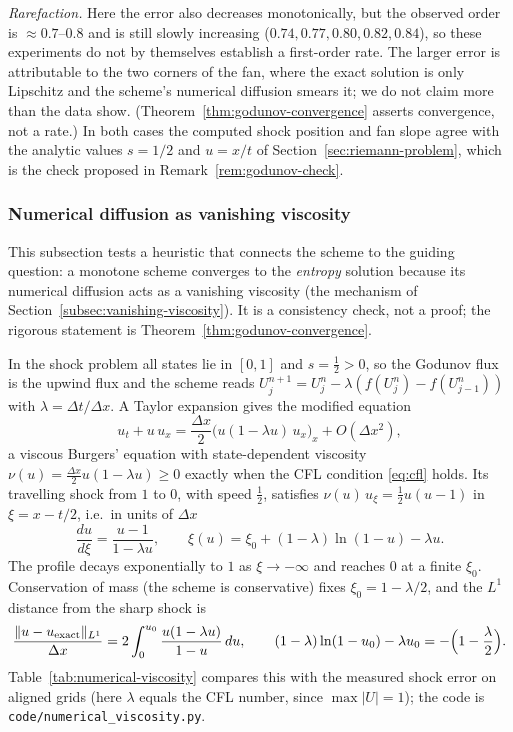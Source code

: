 \emph{Rarefaction.} Here the error also decreases monotonically, but the
observed order is $\approx0.7$--$0.8$ and is still slowly increasing
($0.74,0.77,0.80,0.82,0.84$), so these experiments do not by themselves
establish a first-order rate. The larger error is attributable to the two
corners of the fan, where the exact solution is only Lipschitz and the
scheme's numerical diffusion smears it; we do not claim more than the data
show. (Theorem~\ref{thm:godunov-convergence} asserts convergence, not a
rate.) In both cases the computed shock position and fan slope agree with
the analytic values $s=1/2$ and $u=x/t$ of
Section~\ref{sec:riemann-problem}, which is the check proposed in
Remark~\ref{rem:godunov-check}.

\subsubsection{Numerical diffusion as vanishing viscosity}
\label{subsubsec:numerical-viscosity}

This subsection tests a heuristic that connects the scheme to the guiding
question: a monotone scheme converges to the \emph{entropy} solution because
its numerical diffusion acts as a vanishing viscosity (the mechanism of
Section~\ref{subsec:vanishing-viscosity}). It is a consistency check, not a
proof; the rigorous statement is Theorem~\ref{thm:godunov-convergence}.

In the shock problem all states lie in $[0,1]$ and $s=\tfrac12>0$, so the
Godunov flux is the upwind flux and the scheme reads $U_j^{n+1}=U_j^n-
\lambda(f(U_j^n)-f(U_{j-1}^n))$ with $\lambda=\Delta t/\Delta x$. A Taylor
expansion gives the modified equation
\begin{equation}
  \label{eq:modified-equation}
  u_t+u\,u_x=\frac{\Delta x}{2}\big(u(1-\lambda u)\,u_x\big)_x+O(\Delta x^2),
\end{equation}
a viscous Burgers' equation with state-dependent viscosity
$\nu(u)=\tfrac{\Delta x}2u(1-\lambda u)\ge0$ exactly when the CFL condition
\eqref{eq:cfl} holds. Its travelling shock from $1$ to $0$, with speed
$\tfrac12$, satisfies $\nu(u)\,u_\xi=\tfrac12u(u-1)$ in $\xi=x-t/2$, i.e.\ in
units of $\Delta x$
\begin{equation}
  \frac{du}{d\xi}=\frac{u-1}{1-\lambda u},\qquad
  \xi(u)=\xi_0+(1-\lambda)\ln(1-u)-\lambda u .
\end{equation}
The profile decays exponentially to $1$ as $\xi\to-\infty$ and reaches $0$ at
a finite $\xi_0$. Conservation of mass (the scheme is conservative) fixes
$\xi_0=1-\lambda/2$, and the $L^1$ distance from the sharp shock is
\begin{equation}
  \frac{\|u-u_{\rm exact}\|_{L^1}}{\Delta x}
  =2\int_0^{u_0}\frac{u(1-\lambda u)}{1-u}\,du,\qquad
  (1-\lambda)\ln(1-u_0)-\lambda u_0=-\Big(1-\frac\lambda2\Big).
\end{equation}
Table~\ref{tab:numerical-viscosity} compares this with the measured shock
error on aligned grids (here $\lambda$ equals the CFL number, since
$\max|U|=1$); the code is \texttt{code/numerical\_viscosity.py}.

